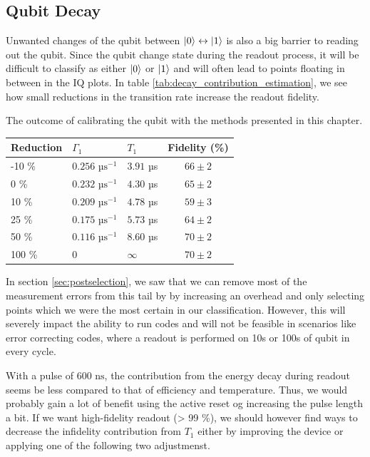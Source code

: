 \subsection{Qubit Decay}
Unwanted changes of the qubit between $\ket{0}\leftrightarrow\ket{1}$ is also a big barrier to reading out the qubit. Since the qubit change state during the readout process, it will be difficult to classify as either $\ket{0}$ or $\ket{1}$ and will often lead to points floating in between in the IQ plots. In table \ref{tab:decay_contribution_estimation}, we see how small reductions in the transition rate increase the readout fidelity. 
\begin{margintable}
\centering
\caption{The outcome of calibrating the qubit with the methods presented in this chapter.}
\vspace{0.3 cm}
\begin{tabular}{lll|c}
\hline
\textbf{Reduction}         &  $\Gamma_1$                  &  $T_1$        & Fidelity (\%)\\ \hline
-10 \%                     &  $0.256 \text{ µs}^{-1}$         &  $3.91$ µs   &  $66 \pm 2$\\
0   \%                     &  $0.232 \text{ µs}^{-1}$         &  $4.30$ µs   &  $65 \pm 2$\\
10  \%                     &  $0.209 \text{ µs}^{-1}$         &  $4.78$ µs   &  $59 \pm 3$\\
25  \%                     &  $0.175 \text{ µs}^{-1}$         &  $5.73$ µs   &  $64 \pm 2$\\
50  \%                     &  $0.116 \text{ µs}^{-1}$         &  $8.60$ µs   &  $70 \pm 2$\\
100 \%                     &  $0$         &  $\infty$                       &  $70 \pm 2$\\
\end{tabular}
\label{tab:decay_contribution_estimation}
\end{margintable}
In section \ref{sec:postselection}, we saw that we can remove most of the measurement errors from this tail by by increasing an overhead and only selecting points which we were the most certain in our classification. However, this will severely impact the ability to run codes and will not be feasible in scenarios like error correcting codes, where a readout is performed on 10s or 100s of qubit in every cycle. 

With a pulse of $600 \text{ ns}$, the contribution from the energy decay during readout seems be less compared to that of efficiency and temperature. Thus, we would probably gain a lot of benefit using the active reset og increasing the pulse length a bit. If we want high-fidelity readout (> 99 \%), we should however find ways to decrease the infidelity contribution from $T_1$ either by improving the device or applying one of the following two adjustmenst.

